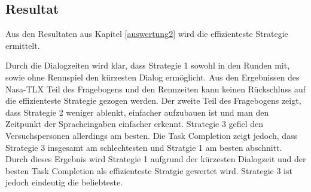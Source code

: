 \documentclass[12pt,a4paper]{scrartcl}
\begin{document}
\subsection{Resultat}
Aus den Resultaten aus Kapitel \ref{auswertung2} wird die effizienteste Strategie ermittelt. \newline

Durch die Dialogzeiten wird klar, dass Strategie 1 sowohl in den Runden mit, sowie ohne Rennspiel den kürzesten Dialog ermöglicht. Aus den Ergebnissen des Nasa-TLX Teil des Fragebogens und den Rennzeiten kann keinen Rückschluss auf die effizienteste Strategie gezogen werden. Der zweite Teil des Fragebogens zeigt, dass Strategie 2 weniger ablenkt, einfacher aufzubauen ist und man den Zeitpunkt der Spracheingaben einfacher erkennt. Strategie 3 gefiel den Versuchspersonen allerdings am besten. Die Task Completion zeigt jedoch, dass Strategie 3 insgesamt am schlechtesten und Stratgie 1 am besten abschnitt. \newline
Durch dieses Ergebnis wird Strategie 1 aufgrund der kürzesten Dialogzeit und der besten Task Completion als effizienteste Stratgie gewertet wird. Strategie 3 ist jedoch eindeutig die beliebteste. 
\end{document}
